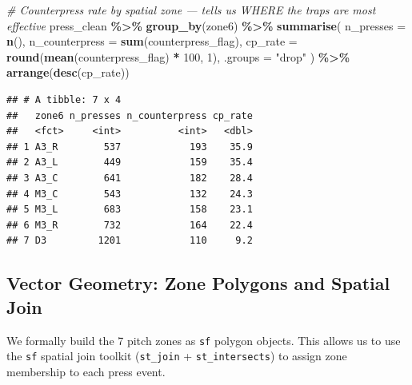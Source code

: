 \documentclass[
]{article}
\newenvironment{Shaded}{\begin{snugshade}}{\end{snugshade}}
\newcommand{\AttributeTok}[1]{\textcolor[rgb]{0.13,0.29,0.53}{#1}}
\newcommand{\CommentTok}[1]{\textcolor[rgb]{0.56,0.35,0.01}{\textit{#1}}}
\newcommand{\DecValTok}[1]{\textcolor[rgb]{0.00,0.00,0.81}{#1}}
\newcommand{\FunctionTok}[1]{\textcolor[rgb]{0.13,0.29,0.53}{\textbf{#1}}}
\newcommand{\NormalTok}[1]{#1}
\newcommand{\SpecialCharTok}[1]{\textcolor[rgb]{0.81,0.36,0.00}{\textbf{#1}}}
\newcommand{\StringTok}[1]{\textcolor[rgb]{0.31,0.60,0.02}{#1}}
\begin{document}
\begin{Shaded}
\begin{Highlighting}[]
\CommentTok{\# Counterpress rate by spatial zone — tells us WHERE the traps are most effective}
\NormalTok{press\_clean }\SpecialCharTok{\%\textgreater{}\%}
  \FunctionTok{group\_by}\NormalTok{(zone6) }\SpecialCharTok{\%\textgreater{}\%}
  \FunctionTok{summarise}\NormalTok{(}
    \AttributeTok{n\_presses      =} \FunctionTok{n}\NormalTok{(),}
    \AttributeTok{n\_counterpress =} \FunctionTok{sum}\NormalTok{(counterpress\_flag),}
    \AttributeTok{cp\_rate        =} \FunctionTok{round}\NormalTok{(}\FunctionTok{mean}\NormalTok{(counterpress\_flag) }\SpecialCharTok{*} \DecValTok{100}\NormalTok{, }\DecValTok{1}\NormalTok{),}
    \AttributeTok{.groups =} \StringTok{"drop"}
\NormalTok{  ) }\SpecialCharTok{\%\textgreater{}\%}
  \FunctionTok{arrange}\NormalTok{(}\FunctionTok{desc}\NormalTok{(cp\_rate))}
\end{Highlighting}
\end{Shaded}

\begin{verbatim}
## # A tibble: 7 x 4
##   zone6 n_presses n_counterpress cp_rate
##   <fct>     <int>          <int>   <dbl>
## 1 A3_R        537            193    35.9
## 2 A3_L        449            159    35.4
## 3 A3_C        641            182    28.4
## 4 M3_C        543            132    24.3
## 5 M3_L        683            158    23.1
## 6 M3_R        732            164    22.4
## 7 D3         1201            110     9.2
\end{verbatim}

\subsection{Vector Geometry: Zone Polygons and Spatial
Join}\label{vector-geometry-zone-polygons-and-spatial-join}

We formally build the 7 pitch zones as \texttt{sf} polygon objects. This
allows us to use the \texttt{sf} spatial join toolkit (\texttt{st\_join}
+ \texttt{st\_intersects}) to assign zone membership to each press
event.
\end{document}
